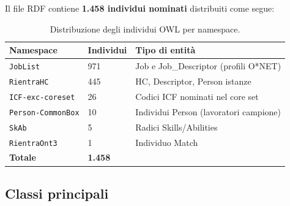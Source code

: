 \documentclass[a4paper,12pt]{article}
\begin{document}
Il file RDF contiene \textbf{1.458 individui nominati} distribuiti come segue:

\begin{table}[H]
\centering
\caption{Distribuzione degli individui OWL per namespace.}
\begin{tabular}{L{5cm} C{2.5cm} L{5cm}}
\toprule
\textbf{Namespace} & \textbf{Individui} & \textbf{Tipo di entit\`{a}} \\
\midrule
\texttt{JobList} & 971 & Job e Job\_Descriptor (profili O*NET) \\
\texttt{RientraHC} & 445 & HC, Descriptor, Person istanze \\
\texttt{ICF-exc-coreset} & 26 & Codici ICF nominati nel core set \\
\texttt{Person-CommonBox} & 10 & Individui Person (lavoratori campione) \\
\texttt{SkAb} & 5 & Radici Skills/Abilities \\
\texttt{RientraOnt3} & 1 & Individuo Match \\
\midrule
\textbf{Totale} & \textbf{1.458} & \\
\bottomrule
\end{tabular}
\end{table}

\subsection{Classi principali}
\end{document}
